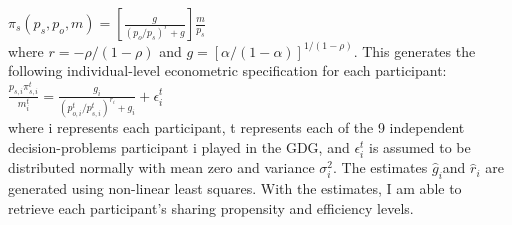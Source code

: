 \documentclass{article}
\begin{document}
 \(\pi_{s}(p_{s},p_{o},m) = [\frac{g}{(p_{o}/p_{s})^{r}+g}]\frac{m}{p_{s}} \) \\
 
 \noindent
where \(r=-\rho / (1-\rho) \) and \(g=[\alpha / (1-\alpha)]^{1/(1-\rho)} \). This generates the following individual-level econometric specification for each participant: \\
 
\( \frac{p_{s,i}\pi^{t}_{s,i}}{m^{t}_{i}} = \frac{g_{i}}{(p^{t}_{o,i}/p^{t}_{s,i})^{r_{i}} + g_{i}} + \epsilon^{t}_{i}\) \\


%
%
%
 
\noindent
where i represents each participant, t represents each of the 9 independent decision-problems participant i played in the GDG, and \( \epsilon^{t}_{i} \) is assumed to be distributed normally with mean zero and variance \(\sigma^{2}_{i}\). The estimates \( \hat{g}_{i} \)and \( \hat{r}_{i} \) are generated using non-linear least squares. With the estimates, I am able to retrieve each participant's sharing propensity and efficiency levels.

%
%
%
\end{document}
